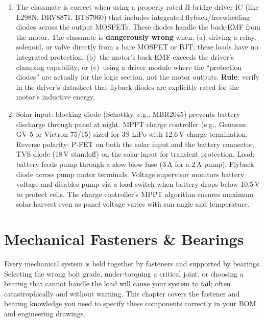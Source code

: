 \documentclass[11pt,letterpaper,twoside,openany]{book}
\begin{document}
\begin{enumerate}[leftmargin=1.5em]
  \item The classmate is correct when using a properly rated H-bridge driver IC (like L298N, DRV8871, BTS7960) that includes integrated flyback/freewheeling diodes across the output MOSFETs. These diodes handle the back-EMF from the motor. The classmate is \textbf{dangerously wrong} when: (a)~driving a relay, solenoid, or valve directly from a bare MOSFET or BJT; these loads have no integrated protection; (b)~the motor's back-EMF exceeds the driver's clamping capability; or (c)~using a driver module where the ``protection diodes'' are actually for the logic section, not the motor outputs. \textbf{Rule}: verify in the driver's datasheet that flyback diodes are explicitly rated for the motor's inductive energy.

  \item Solar input: blocking diode (Schottky, e.g., MBR2045) prevents battery discharge through panel at night. MPPT charge controller (e.g., Genasun GV-5 or Victron 75/15) sized for 3S LiPo with 12.6\,V charge termination. Reverse polarity: P-FET on both the solar input and the battery connector. TVS diode (18\,V standoff) on the solar input for transient protection. Load: battery feeds pump through a slow-blow fuse (3\,A for a 2\,A pump). Flyback diode across pump motor terminals. Voltage supervisor monitors battery voltage and disables pump via a load switch when battery drops below 10.5\,V to protect cells. The charge controller's MPPT algorithm ensures maximum solar harvest even as panel voltage varies with sun angle and temperature.
\end{enumerate}





\chapter{Mechanical Fasteners \& Bearings}

\vspace{1em}

Every mechanical system is held together by fasteners and supported by bearings. Selecting the wrong bolt grade, under-torquing a critical joint, or choosing a bearing that cannot handle the load will cause your system to fail; often catastrophically and without warning. This chapter covers the fastener and bearing knowledge you need to specify these components correctly in your BOM and engineering drawings.
\end{document}
